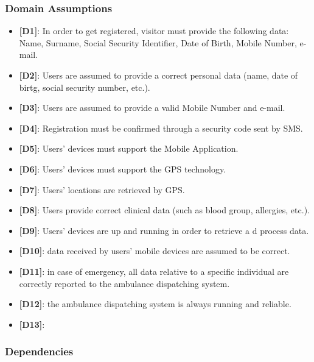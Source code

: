 \documentclass[12pt,a4paper]{article}
\begin{document}
			\subsubsection{Domain Assumptions}
			\begin{itemize}
				\item {\textbf[}\textbf{D1}{\textbf]}: In order to get registered, visitor must provide the following data: Name, Surname, Social Security Identifier, Date of Birth, Mobile Number, e-mail.
				\item {\textbf[}\textbf{D2}{\textbf]}: Users are assumed to provide a correct personal data (name, date of birtg, social security number, etc.).
				\item {\textbf[}\textbf{D3}{\textbf]}: Users are assumed to provide a valid Mobile Number and e-mail.
				\item {\textbf[}\textbf{D4}{\textbf]}: Registration must be confirmed through a security code sent by SMS.
   \item {\textbf[}\textbf{D5}{\textbf]}: Users' devices must support the Mobile Application.
   \item {\textbf[}\textbf{D6}{\textbf]}: Users' devices must support the GPS technology.
				\item {\textbf[}\textbf{D7}{\textbf]}: Users' locations are retrieved by GPS.
				\item {\textbf[}\textbf{D8}{\textbf]}: Users provide correct clinical data (such as blood group, allergies, etc.).
        \item {\textbf[}\textbf{D9}{\textbf]}: Users' devices are up and running in order to retrieve a d process data.
        \item {\textbf[}\textbf{D10}{\textbf]}: data received by users' mobile devices are assumed to be correct.
        \item {\textbf[}\textbf{D11}{\textbf]}: in case of emergency, all data relative to a specific individual are correctly reported to the ambulance dispatching system.
        \item {\textbf[}\textbf{D12}{\textbf]}: the ambulance dispatching system is always running and reliable.
        \item {\textbf[}\textbf{D13}{\textbf]}: 
			\end{itemize}
			\subsubsection{Dependencies}
\end{document}
